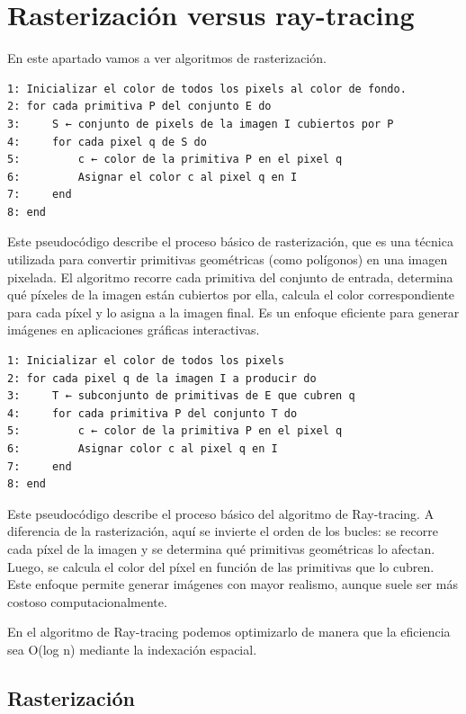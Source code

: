 \documentclass[12pt]{book} %
\begin{document}
\hypertarget{rasterizaciuxf3n-versus-ray-tracing}{%
\section{Rasterización versus
ray-tracing}\label{rasterizaciuxf3n-versus-ray-tracing}}

En este apartado vamos a ver algoritmos de rasterización.

\begin{lstlisting}
1: Inicializar el color de todos los pixels al color de fondo.
2: for cada primitiva P del conjunto E do
3:     S ← conjunto de pixels de la imagen I cubiertos por P
4:     for cada pixel q de S do
5:         c ← color de la primitiva P en el pixel q
6:         Asignar el color c al pixel q en I
7:     end
8: end
\end{lstlisting}

Este pseudocódigo describe el proceso básico de rasterización, que es
una técnica utilizada para convertir primitivas geométricas (como
polígonos) en una imagen pixelada. El algoritmo recorre cada primitiva
del conjunto de entrada, determina qué píxeles de la imagen están
cubiertos por ella, calcula el color correspondiente para cada píxel y
lo asigna a la imagen final. Es un enfoque eficiente para generar
imágenes en aplicaciones gráficas interactivas.

\begin{lstlisting}
1: Inicializar el color de todos los pixels
2: for cada pixel q de la imagen I a producir do
3:     T ← subconjunto de primitivas de E que cubren q
4:     for cada primitiva P del conjunto T do
5:         c ← color de la primitiva P en el pixel q
6:         Asignar color c al pixel q en I
7:     end
8: end
\end{lstlisting}

Este pseudocódigo describe el proceso básico del algoritmo de
Ray-tracing. A diferencia de la rasterización, aquí se invierte el orden
de los bucles: se recorre cada píxel de la imagen y se determina qué
primitivas geométricas lo afectan. Luego, se calcula el color del píxel
en función de las primitivas que lo cubren. Este enfoque permite generar
imágenes con mayor realismo, aunque suele ser más costoso
computacionalmente.

En el algoritmo de Ray-tracing podemos optimizarlo de manera que la
eficiencia sea O(log n) mediante la indexación espacial.

\hypertarget{rasterizaciuxf3n}{%
\subsection{Rasterización}\label{rasterizaciuxf3n}}
\end{document}
